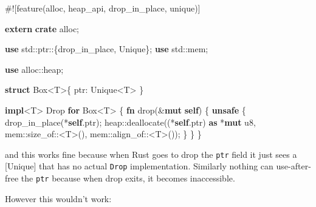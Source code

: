 \documentclass[a4paper,]{book}
\newenvironment{Shaded}{\begin{snugshade}}{\end{snugshade}}
\newcommand{\KeywordTok}[1]{\textcolor[rgb]{0.13,0.29,0.53}{\textbf{{#1}}}}
\newcommand{\DataTypeTok}[1]{\textcolor[rgb]{0.13,0.29,0.53}{{#1}}}
\newcommand{\BuiltInTok}[1]{{#1}}
\newcommand{\AttributeTok}[1]{\textcolor[rgb]{0.77,0.63,0.00}{{#1}}}
\newcommand{\NormalTok}[1]{{#1}}
\begin{document}
\begin{Shaded}
\begin{Highlighting}[]
\AttributeTok{#![}\NormalTok{feature}\AttributeTok{(}\NormalTok{alloc}\AttributeTok{,} \NormalTok{heap_api}\AttributeTok{,} \NormalTok{drop_in_place}\AttributeTok{,} \NormalTok{unique}\AttributeTok{)]}

\KeywordTok{extern} \KeywordTok{crate} \NormalTok{alloc;}

\KeywordTok{use} \NormalTok{std::ptr::\{drop_in_place, Unique\};}
\KeywordTok{use} \NormalTok{std::mem;}

\KeywordTok{use} \NormalTok{alloc::heap;}

\KeywordTok{struct} \DataTypeTok{Box}\NormalTok{<T>\{ ptr: Unique<T> \}}

\KeywordTok{impl}\NormalTok{<T> }\BuiltInTok{Drop} \KeywordTok{for} \DataTypeTok{Box}\NormalTok{<T> \{}
    \KeywordTok{fn} \NormalTok{drop(&}\KeywordTok{mut} \KeywordTok{self}\NormalTok{) \{}
        \KeywordTok{unsafe} \NormalTok{\{}
            \NormalTok{drop_in_place(*}\KeywordTok{self}\NormalTok{.ptr);}
            \NormalTok{heap::deallocate((*}\KeywordTok{self}\NormalTok{.ptr) }\KeywordTok{as} \NormalTok{*}\KeywordTok{mut} \DataTypeTok{u8}\NormalTok{,}
                             \NormalTok{mem::size_of::<T>(),}
                             \NormalTok{mem::align_of::<T>());}
        \NormalTok{\}}
    \NormalTok{\}}
\NormalTok{\}}
\end{Highlighting}
\end{Shaded}

and this works fine because when Rust goes to drop the \texttt{ptr}
field it just sees a {[}Unique{]} that has no actual \texttt{Drop}
implementation. Similarly nothing can use-after-free the \texttt{ptr}
because when drop exits, it becomes inaccessible.

However this wouldn't work:
\end{document}
